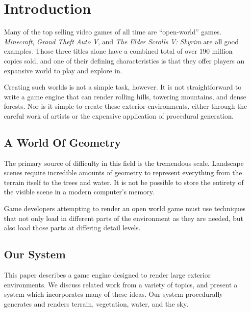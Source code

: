 
\chapter{Introduction}


Many of the top selling video games of all time are ``open-world'' games.
{\em Minecraft}, {\em Grand Theft Auto V}, and {\em The Elder Scrolls V: Skyrim} are all good examples.
Those three titles alone have a combined total of over 190 million copies sold, and one of their defining characteristics is that they offer players an expansive world to play and explore in.

Creating such worlds is not a simple task, however.
It is not straightforward to write a game engine that can render rolling hills, towering mountains, and dense forests.
Nor is it simple to create these exterior environments, either through the careful work of artists or the expensive application of procedural generation.


\section{A World Of Geometry}

The primary source of difficulty in this field is the tremendous scale.
Landscape scenes require incredible amounts of geometry to represent everything from the terrain itself to the trees and water.
It is not be possible to store the entirety of the visible scene in a modern computer's memory.

Game developers attempting to render an open world game must use techniques that not only load in different parts of the environment as they are needed, but also load those parts at differing detail levels.


\section{Our System}

This paper describes a game engine designed to render large exterior environments.
We discuss related work from a variety of topics, and present a system which incorporates many of these ideas.
Our system procedurally generates and renders terrain, vegetation, water, and the sky.
